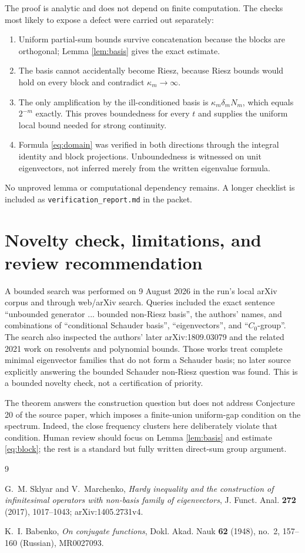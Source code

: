 \documentclass[11pt]{article}
\begin{document}
The proof is analytic and does not depend on finite computation.  The checks
most likely to expose a defect were carried out separately:
\begin{enumerate}[leftmargin=*,label=\arabic*.]
\item Uniform partial-sum bounds survive concatenation because the blocks are
orthogonal; Lemma \ref{lem:basis} gives the exact estimate.
\item The basis cannot accidentally become Riesz, because Riesz bounds would
hold on every block and contradict $\kappa_m\to\infty$.
\item The only amplification by the ill-conditioned basis is
$\kappa_m\delta_mN_m$, which equals $2^{-m}$ exactly.  This proves boundedness
for every $t$ and supplies the uniform local bound needed for strong
continuity.
\item Formula \eqref{eq:domain} was verified in both directions through the
integral identity and block projections.  Unboundedness is witnessed on unit
eigenvectors, not inferred merely from the written eigenvalue formula.
\end{enumerate}
No unproved lemma or computational dependency remains.  A longer checklist is
included as \texttt{verification\_report.md} in the packet.

\section{Novelty check, limitations, and review recommendation}

A bounded search was performed on 9 August 2026 in the run's local arXiv
corpus and through web/arXiv search.  Queries included the exact sentence
``unbounded generator ... bounded non-Riesz basis'', the authors' names, and
combinations of ``conditional Schauder basis'', ``eigenvectors'', and
``$C_0$-group''.  The search also inspected the authors' later arXiv:1809.03079
and the related 2021 work on resolvents and polynomial bounds.  Those works
treat complete minimal eigenvector families that do not form a Schauder basis;
no later source explicitly answering the bounded Schauder non-Riesz question
was found.  This is a bounded novelty check, not a certification of priority.

The theorem answers the construction question but does not address Conjecture
20 of the source paper, which imposes a finite-union uniform-gap condition on
the spectrum.  Indeed, the close frequency clusters here deliberately violate
that condition.  Human review should focus on Lemma \ref{lem:basis} and
estimate \eqref{eq:block}; the rest is a standard but fully written direct-sum
group argument.

\begin{thebibliography}{9}

G.~M. Sklyar and V.~Marchenko,
\emph{Hardy inequality and the construction of infinitesimal operators with
non-basis family of eigenvectors},
J. Funct. Anal. \textbf{272} (2017), 1017--1043;
arXiv:1405.2731v4.

K.~I. Babenko,
\emph{On conjugate functions},
Dokl. Akad. Nauk \textbf{62} (1948), no.~2, 157--160 (Russian),
MR0027093.

\end{thebibliography}
\end{document}
